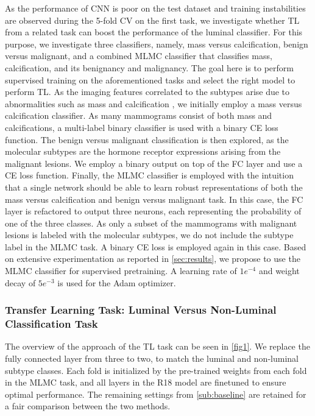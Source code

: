 \documentclass{article}
\begin{document}
  

As the performance of CNN is poor on the test dataset and training instabilities are observed during the 5-fold CV on the first task, we investigate whether TL from a related task can boost the performance of the luminal classifier. For this purpose, we investigate three classifiers, namely, mass versus calcification, benign versus malignant, and a combined MLMC classifier that classifies mass, calcification, and its benignancy and malignancy. The goal here is to perform supervised training on the aforementioned tasks and select the right model to perform TL. As the imaging features correlated to the subtypes arise due to abnormalities such as mass and calcification \cite {horvath2021molecular, cho2016molecular, boisserie2013correlation}, we initially employ a mass versus calcification classifier. As many mammograms consist of both mass and calcifications, a multi-label binary classifier is used with a binary CE loss function. The benign versus malignant classification is then explored, as the molecular subtypes are the hormone receptor expressions arising from the malignant lesions. We employ a binary output on top of the FC layer and use a CE loss function. Finally, the MLMC classifier is employed with the intuition that a single network should be able to learn robust representations of both the mass versus calcification and benign versus malignant task. In this case, the FC layer is refactored to output three neurons, each representing the probability of one of the three classes. As only a subset of the mammograms with malignant lesions is labeled with the molecular subtypes, we do not include the subtype label in the MLMC task. A binary CE loss is employed again in this case. Based on extensive experimentation as reported in \cref{sec:results}, we propose to use the MLMC classifier for supervised pretraining. A learning rate of $1e^ {-4} $ and weight decay of $5e^ {-3} $ is used for the Adam optimizer.  

\subsubsection {Transfer Learning Task: Luminal Versus Non-Luminal Classification Task} 

The overview of the approach of the TL task can be seen in \cref{fig1}. We replace the fully connected layer from three to two, to match the luminal and non-luminal subtype classes. Each fold is initialized by the pre-trained weights from each fold in the MLMC task, and all layers in the R18 model are finetuned to ensure optimal performance. The remaining settings from \cref{sub:baseline} are retained for a fair comparison between the two methods. 
\end{document}
